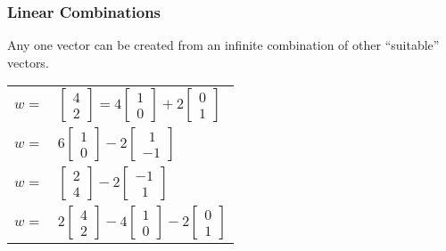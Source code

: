\documentclass[10pt]{beamer}
\begin{document}
\begin{frame}[shrink]
\frametitle{Linear Combinations}

Any one vector can be created from an infinite combination
of other ``suitable'' vectors.

\begin{center}
\begin{tabular}{cl}
    $w=$ &  $\displaystyle\begin{bmatrix} 4 \\ 2 \end{bmatrix}
           = 4\begin{bmatrix} 1 \\ 0 \end{bmatrix} + 2\begin{bmatrix} 0 \\ 1 \end{bmatrix}$ \\[36pt]
    $w=$ & $\displaystyle 6\begin{bmatrix} 1 \\ 0 \end{bmatrix} - 2 \begin{bmatrix} \ \ 1 \\ -1 \end{bmatrix}$ \\[36pt]
    $w=$ & $\displaystyle \begin{bmatrix} 2 \\ 4 \end{bmatrix} - 2 \begin{bmatrix} -1 \\ \ \ 1 \end{bmatrix}$ \\[36pt]
    $w=$ & $\displaystyle 2\begin{bmatrix} 4 \\ 2 \end{bmatrix} - 4 \begin{bmatrix} 1 \\ 0 \end{bmatrix}
                                              - 2 \begin{bmatrix} 0 \\ 1 \end{bmatrix}$
\end{tabular}
\end{center}

\end{frame}
\end{document}
